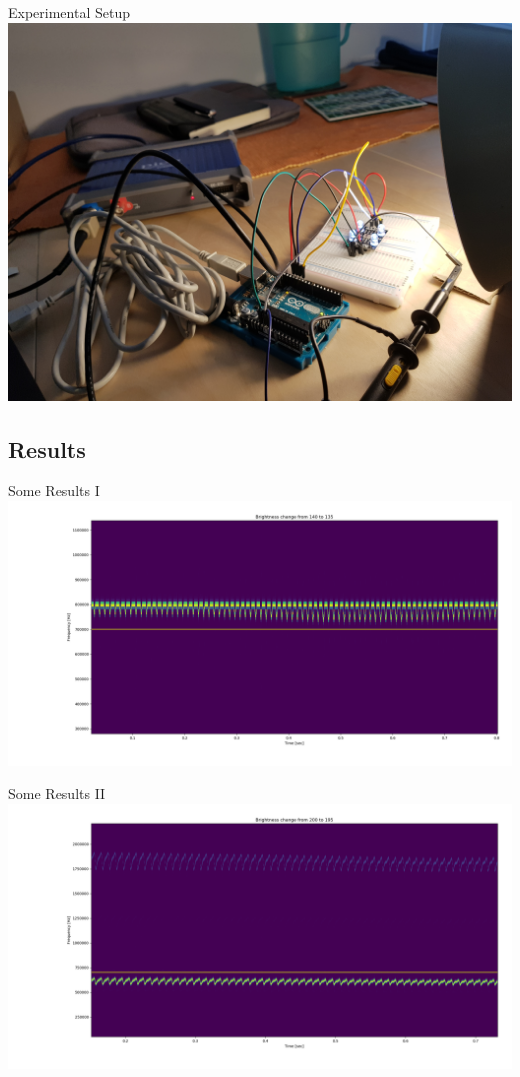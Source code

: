 \documentclass[11pt,t,usepdftitle=false,aspectratio=169]{beamer}
\begin{document}
\begin{frame}{Experimental Setup}
	\centering
	\includegraphics[trim={0 0 0 12cm},clip]{../experiment/project_setup/20180510_123244.jpg}
\end{frame}

\subsection{Results}%
\label{sub:results}

\begin{frame}{Some Results I}
	\includegraphics[width=\textwidth]{../experiment/140-135-2.png}
\end{frame}

\begin{frame}{Some Results II}
	\includegraphics[width=\textwidth]{../experiment/200-195-10Mhz.png}
\end{frame}
\end{document}
